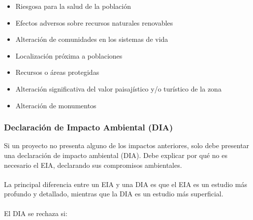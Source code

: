 \documentclass{article} %
\begin{document}
\begin{itemize}[label={},left=0pt,align=parleft]
    \item \begin{highlightbox}[levelone] Riesgosa para la salud de la población \end{highlightbox}
    \item \begin{highlightbox}[levelone] Efectos adversos sobre recursos naturales renovables \end{highlightbox}
    \item \begin{highlightbox}[levelone] Alteración de comunidades en los sistemas de vida \end{highlightbox}
    \item \begin{highlightbox}[levelone] Localización próxima a poblaciones \end{highlightbox}
    \item \begin{highlightbox}[levelone] Recursos o áreas protegidas \end{highlightbox}
    \item \begin{highlightbox}[levelone] Alteración significativa del valor paisajístico y/o turístico de la zona \end{highlightbox}
    \item \begin{highlightbox}[levelone] Alteración de monumentos \end{highlightbox}
\end{itemize}

\subsubsection{Declaración de Impacto Ambiental (DIA)}

Si un proyecto no presenta alguno de los impactos anteriores, solo debe presentar una declaración de impacto ambiental (DIA). Debe explicar por qué no es necesario el EIA, declarando sus compromisos ambientales. \\ \\
La principal diferencia entre un EIA y una DIA es que el EIA es un estudio más profundo y detallado, mientras que la DIA es un estudio más superficial. \\ \\
El DIA se rechaza si:
\end{document}
